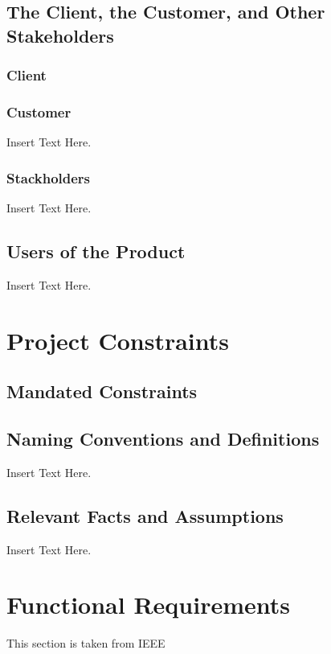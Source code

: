\documentclass [12pt]{article}
\begin{document}
\subsection{The Client, the Customer, and Other Stakeholders}

\subsubsection{Client}
\lipsum[1]  %

\subsubsection{Customer}
 Insert Text Here.

\subsubsection{Stackholders}
 Insert Text Here.

\subsection{Users of the Product} 
Insert Text Here.\\


\section{\textbf{Project Constraints}}


\subsection{Mandated Constraints}
\lipsum[1]  %
\subsection{Naming Conventions and Definitions}
	Insert Text Here.
	
\subsection{Relevant Facts and Assumptions} 
	Insert Text Here.



\section {Functional Requirements} 
This section is taken from IEEE
\end{document}

